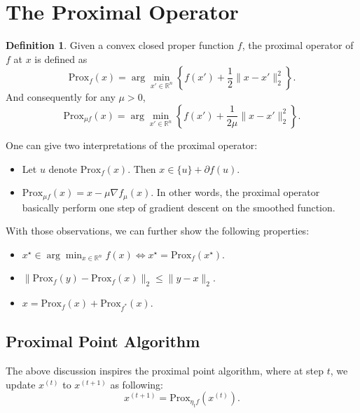 \documentclass[openany]{book}
\theoremstyle{definition}
\newtheorem{definition}{Definition}[chapter]
\theoremstyle{remark}
\begin{document}
\section{The Proximal Operator}
\begin{definition}
    Given a convex closed proper function $f$, the proximal operator of $f$ at $x$ is defined as
    \begin{equation}\label{proximal}
        \mathrm{Prox}_f(x)=\arg\min_{x'\in \mathbb{R}^n}\left\{f(x')+\frac{1}{2}\|x-x'\|_2^2\right\}.
    \end{equation}
    And consequently for any $\mu>0$,
    \begin{equation}
        \mathrm{Prox}_{\mu f}(x)=\arg\min_{x'\in \mathbb{R}^n}\left\{f(x')+\frac{1}{2\mu}\|x-x'\|_2^2\right\}.
    \end{equation}
\end{definition}

One can give two interpretations of the proximal operator:
\begin{itemize}
    \item Let $u$ denote $\mathrm{Prox}_f(x)$. Then $x\in\{u\}+\partial f(u)$.
    \item $\mathrm{Prox}_{\mu f}(x)=x-\mu\nabla f_{\mu}(x)$. In other words, the proximal operator basically perform one step of gradient descent on the smoothed function.
\end{itemize}
With those observations, we can further show the following properties:
\begin{itemize}
    \item $x^{\star}\in\arg\min_{x\in \mathbb{R}^n}f(x)\iff x^{\star}=\mathrm{Prox}_f(x^{\star})$.
    \item $\|\mathrm{Prox}_f(y)-\mathrm{Prox}_f(x)\|_2\le\|y-x\|_2$.
    \item $x=\mathrm{Prox}_f(x)+\mathrm{Prox}_{f^*}(x)$.
\end{itemize}

\subsection{Proximal Point Algorithm}
The above discussion inspires the proximal point algorithm, where at step $t$, we update $x^{(t)}$ to $x^{(t+1)}$ as following:
\begin{equation}\label{proxAlg}
    x^{(t+1)}=\mathrm{Prox}_{\eta_t f}(x^{(t)}).
\end{equation}
\end{document}
